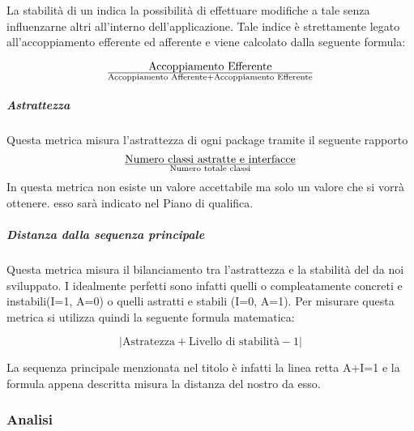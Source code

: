 La stabilità di un  indica la possibilità di effettuare modifiche a tale  senza influenzarne altri all'interno dell'applicazione. Tale indice è strettamente legato all'accoppiamento efferente ed afferente e viene calcolato dalla seguente formula:

\begin{displaymath}
{\text{Accoppiamento Efferente}}\over{\text{Accoppiamento Afferente} + \text{Accoppiamento Efferente}}
\end{displaymath}

\subparagraph{Astrattezza}
Questa metrica misura l'astrattezza di ogni package tramite il seguente rapporto 
\begin{displaymath}
{\text{Numero classi astratte e interfacce}}\over{\text{Numero totale classi}}
\end{displaymath}
In questa metrica non esiste un valore accettabile ma solo un valore che si vorrà ottenere. esso sarà indicato nel Piano di qualifica.
\subparagraph{Distanza dalla sequenza principale}
Questa metrica misura il bilanciamento tra l'astrattezza e la stabilità del  da noi sviluppato. I  idealmente perfetti sono infatti quelli o compleatamente concreti e instabili(I=1, A=0) o quelli astratti e stabili (I=0, A=1). Per misurare questa metrica si utilizza quindi la seguente formula matematica:

\begin{displaymath}
{|\text{Astratezza} + \text{Livello di stabilità} - 1|}
\end{displaymath}

La sequenza principale menzionata nel titolo è infatti la linea retta A+I=1 e la formula appena descritta misura la distanza del nostro  da esso.


\subsubsection{Analisi}
